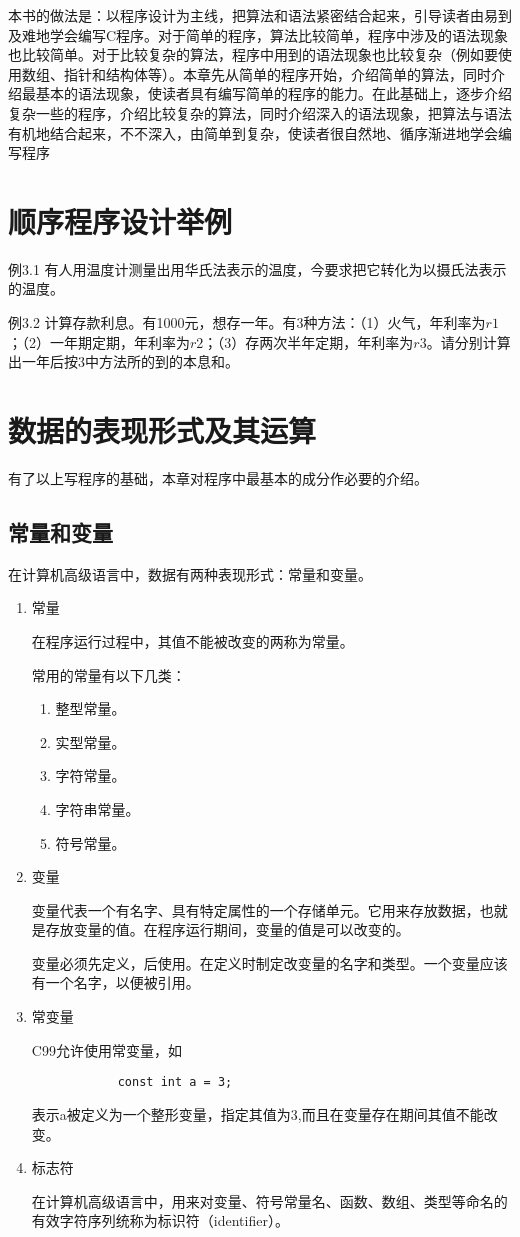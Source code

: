 本书的做法是：以程序设计为主线，把算法和语法紧密结合起来，引导读者由易到及难地学会编写C程序。对于简单的程序，算法比较简单，程序中涉及的语法现象也比较简单。对于比较复杂的算法，程序中用到的语法现象也比较复杂（例如要使用数组、指针和结构体等）。本章先从简单的程序开始，介绍简单的算法，同时介绍最基本的语法现象，使读者具有编写简单的程序的能力。在此基础上，逐步介绍复杂一些的程序，介绍比较复杂的算法，同时介绍深入的语法现象，把算法与语法有机地结合起来，不不深入，由简单到复杂，使读者很自然地、循序渐进地学会编写程序
\section{顺序程序设计举例}
例3.1 有人用温度计测量出用华氏法表示的温度，今要求把它转化为以摄氏法表示的温度。

例3.2 计算存款利息。有1000元，想存一年。有3种方法：（1）火气，年利率为$r1$；（2）一年期定期，年利率为$r2$；（3）存两次半年定期，年利率为$r3$。请分别计算出一年后按3中方法所的到的本息和。
\section{数据的表现形式及其运算}
有了以上写程序的基础，本章对程序中最基本的成分作必要的介绍。
\subsection{常量和变量}
在计算机高级语言中，数据有两种表现形式：常量和变量。
\begin{enumerate}
	\item 常量

		在程序运行过程中，其值不能被改变的两称为常量。

		常用的常量有以下几类：
		\begin{enumerate}
			\item 整型常量。
			\item 实型常量。
			\item 字符常量。
			\item 字符串常量。
			\item 符号常量。
		\end{enumerate}
	\item 变量

		变量代表一个有名字、具有特定属性的一个存储单元。它用来存放数据，也就是存放变量的值。在程序运行期间，变量的值是可以改变的。

		变量必须先定义，后使用。在定义时制定改变量的名字和类型。一个变量应该有一个名字，以便被引用。
	\item 常变量

		C99允许使用常变量，如
		\begin{lstlisting}
			const int a = 3;
		\end{lstlisting}
		表示a被定义为一个整形变量，指定其值为3,而且在变量存在期间其值不能改变。
	\item 标志符

		在计算机高级语言中，用来对变量、符号常量名、函数、数组、类型等命名的有效字符序列统称为标识符（identifier）。
\end{enumerate}
